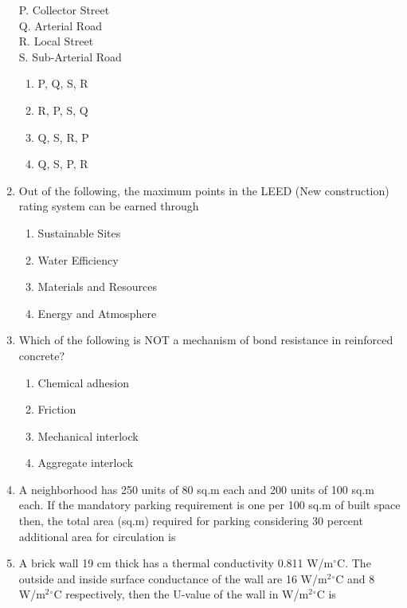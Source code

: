 \documentclass[journal,12pt,onecolumn]{IEEEtran}
\theoremstyle{remark}
\begin{document}
\begin{enumerate}
P. Collector Street\\
Q. Arterial Road\\
R. Local Street\\
S. Sub-Arterial Road

\hfill{}
\begin{enumerate}
\item P, Q, S, R
\item R, P, S, Q
\item Q, S, R, P
\item Q, S, P, R
\end{enumerate}

\item Out of the following, the maximum points in the LEED (New construction) rating system can be earned through

\hfill{}
\begin{enumerate}
\item Sustainable Sites
\item Water Efficiency
\item Materials and Resources
\item Energy and Atmosphere
\end{enumerate}

\item Which of the following is NOT a mechanism of bond resistance in reinforced concrete?

\hfill{}
\begin{enumerate}
\item Chemical adhesion
\item Friction
\item Mechanical interlock
\item Aggregate interlock
\end{enumerate}

\item A neighborhood has 250 units of 80 sq.m each and 200 units of 100 sq.m each. If the mandatory parking requirement is one per 100 sq.m of built space then, the total area (sq.m) required for parking considering 30 percent additional area for circulation is \underline{\hspace{2cm}}

\hfill{}

\item A brick wall 19 cm thick has a thermal conductivity 0.811 W/m$^\circ$C. The outside and inside surface conductance of the wall are 16 W/m$^2$$^\circ$C and 8 W/m$^2$$^\circ$C respectively, then the U-value of the wall in W/m$^2$$^\circ$C is \underline{\hspace{2cm}}


\end{enumerate}
\end{document}
